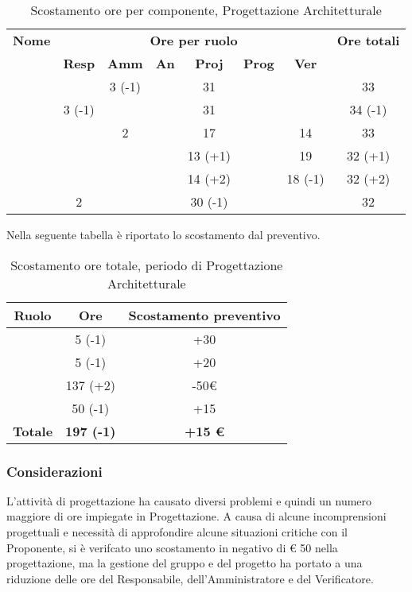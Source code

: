 \begin{table}[H]
	\begin{center}
		\begin{tabular}{|c|c|c|c|c|c|c|c|}
			\hline
			\textbf{Nome} & \multicolumn{6}{c|}{\textbf{Ore per ruolo}} & \textbf{Ore totali} \\\cline{2-7}
			& \textbf{Resp} & \textbf{Amm} & \textbf{An} & \textbf{Proj} & \textbf{Prog} & \textbf{Ver} & \\
			\hline
			\MC			&		&	3 (-1)	&		&	31		&		&		&   33	\\
			\hline
			\AN			&3 (-1)	&			&		&	31		&		&		& 	34 (-1)	\\
			\hline
			\DAN		&		&	2		&		&	17		&		&	14	&	33	\\
			\hline
			\AS			&		&		 	&	 	&	13 (+1)	&	 	& 	19	&	32 (+1)	\\
			\hline
			\NS 		&		&			&		&	14 (+2)	&		& 	18 (-1)	&	32 (+2)	\\
			\hline
			\DS			& 	2	&			&		&	30 (-1)	&		&		&	32	\\
			\hline
		\end{tabular}
	\end{center}
	\caption{Scostamento ore per componente, Progettazione Architetturale}
\end{table}

Nella seguente tabella è riportato lo scostamento dal preventivo.

\begin{table}[H]
	\begin{center}
		\begin{tabular}{|c|c|c|}
			\hline
			\textbf{Ruolo}	& \textbf{Ore}	& \textbf{Scostamento preventivo} \\
			\hline
			\Res	&	5 (-1)	&	+30	\\
			\hline
			\Amm	&	5 (-1)	&	+20	\\
			\hline
			\Prog   &	137 (+2)  &	-50€	\\
			\hline
			\Ver	&	50 (-1)	&	+15 \\
			\hline
			\textbf{Totale} & \textbf{197 (-1)} & \textbf{+15 €}\\
			\hline
		\end{tabular}
	\end{center}
	\caption{Scostamento ore totale, periodo di Progettazione Architetturale}
\end{table}

\subsubsection{Considerazioni}
L'attività di progettazione ha causato diversi problemi e quindi un numero maggiore di ore impiegate in Progettazione. A causa di alcune incomprensioni progettuali e necessità di approfondire alcune situazioni critiche con il Proponente, si è verifcato uno scostamento in negativo di € 50 nella progettazione, ma la gestione del gruppo e del progetto ha portato a una riduzione delle ore del Responsabile, dell'Amministratore e del Verificatore.

